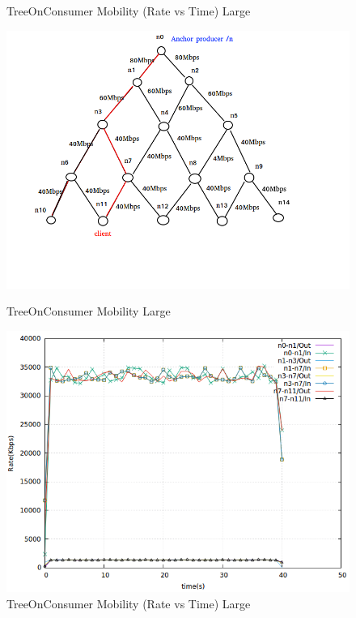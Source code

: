 \begin{figure}[H]
\begin{center}
\caption{TreeOnConsumer Mobility (Rate vs Time) Large} \label{mob1} 


\end{center}

\end{figure}

\begin{figure}[H]

\begin{center}

\includegraphics[scale = 0.4]{Figures/Mob2.png}

\caption{TreeOnConsumer Mobility Large} \label{Mob2} 


\includegraphics[scale = 0.4]{Figures/mob2.png}

\caption{TreeOnConsumer Mobility (Rate vs Time) Large} \label{mob2} 


\end{center}

\end{figure}

